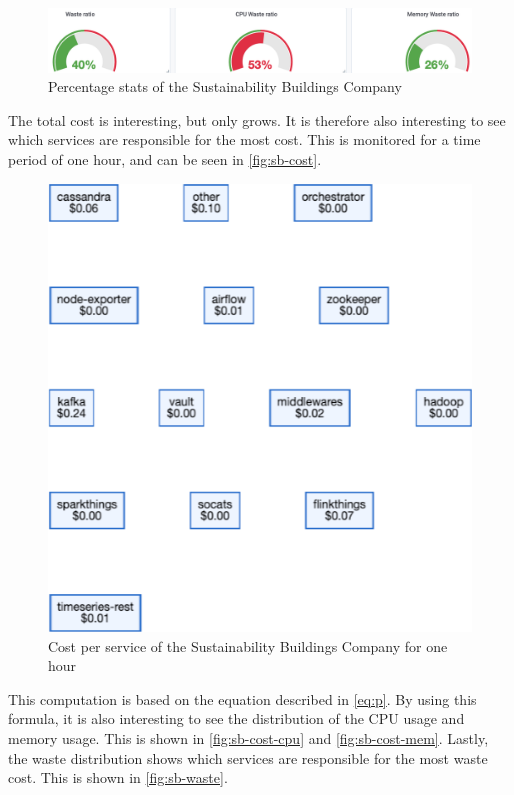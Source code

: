 \begin{figure}
    \centering
    \includegraphics[width=\textwidth]{gfx/stats_percentage.png}
    \caption{Percentage stats of the Sustainability Buildings Company}
    \label{fig:stats_percentage}
\end{figure}

\noindent
The total cost is interesting, but only grows. It is therefore also interesting to see which services are responsible for the most cost. This is monitored for a time period of one hour, and can be seen in \autoref{fig:sb-cost}.\\

\begin{figure}
    \centering
    \includegraphics[width=\textwidth]{gfx/sb-cost.png}
    \caption{Cost per service of the Sustainability Buildings Company for one hour}
    \label{fig:sb-cost}
\end{figure}

\noindent
This computation is based on the equation described in \autoref{eq:p}. By using this formula, it is also interesting to see the distribution of the CPU usage and memory usage. This is shown in \autoref{fig:sb-cost-cpu} and \autoref{fig:sb-cost-mem}. Lastly, the waste distribution shows which services are responsible for the most waste cost. This is shown in \autoref{fig:sb-waste}.

